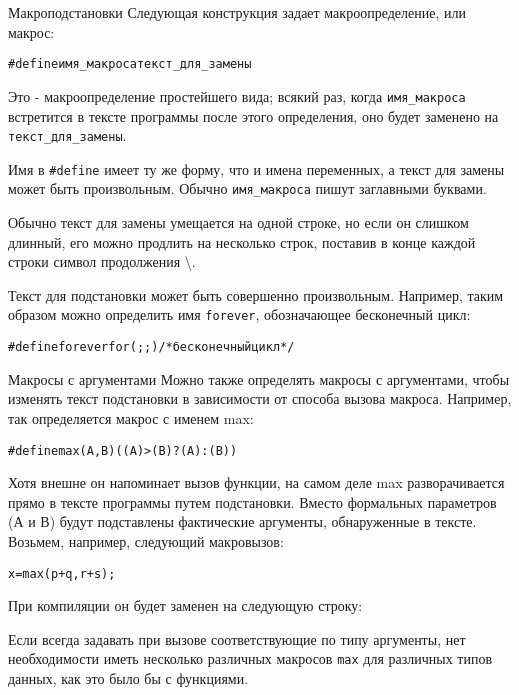 \documentclass{beamer}
\begin{document}
\begin{frame}{Макроподстановки}
    Следующая конструкция задает макроопределение, или макрос:
    
    \begin{alltt}
    \#define имя\_макроса текст\_для\_замены
    \end{alltt}
    
    \medskip
    Это - макроопределение простейшего вида; всякий раз, когда \texttt{имя\_макроса} встретится в тексте программы после этого определения, оно будет заменено на \texttt{текст\_для\_замены}.
    
    \medskip
    Имя в \texttt{#define} имеет ту же форму, что и имена переменных, а текст для замены может быть произвольным. Обычно \texttt{имя\_макроса} пишут заглавными буквами.
    
    \medskip
    Обычно текст для замены умещается на одной строке, но если он слишком длинный, его можно продлить на несколько строк, поставив в конце каждой строки символ продолжения \backslash.
    
    \medskip
    Текст для подстановки может быть совершенно произвольным. Например, таким образом можно определить имя \texttt{forever}, обозначающее бесконечный цикл:
    
    \medskip
    \begin{alltt}
    \#define forever for (;;) /* бесконечный цикл */
    \end{alltt}
\end{frame}

\begin{frame}{Макросы с аргументами}
    Можно также определять макросы с аргументами, чтобы изменять текст подстановки в зависимости от способа вызова макроса. Например, так определяется макрос с именем max:
    
    \begin{alltt}
    \#define max(А, В) ((А) > (В) ? (А) : (В))
    \end{alltt}
    
    Хотя внешне он напоминает вызов функции, на самом деле max разворачивается прямо в тексте программы путем подстановки. Вместо формальных параметров (А и В) будут подставлены фактические аргументы, обнаруженные в тексте. Возьмем, например, следующий макровызов:
    
    \begin{alltt}
    х = max(p+q, r+s);
    \end{alltt}
    
    При компиляции он будет заменен на следующую строку:
    
    \begin{alltt}
    \end{alltt}
    
    Если всегда задавать при вызове соответствующие по типу аргументы, нет необходимости иметь несколько различных макросов \texttt{max} для различных типов данных, как это было бы с функциями.
\end{frame}
\end{document}
